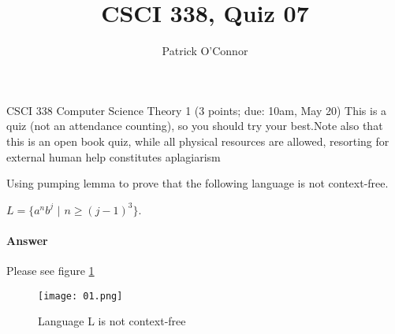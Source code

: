 \documentclass{article}
\title{CSCI 338, Quiz 07}
\author{Patrick O'Connor}
\begin{document}
\maketitle

CSCI 338 Computer Science Theory
1 (3 points; due: 10am, May 20)
This is a quiz (not an attendance counting), so you should 
try your best.Note also that this is an open book quiz, 
while all physical resources are allowed, resorting for external human 
help constitutes aplagiarism


Using pumping lemma to prove that the following language is not context-free.

$L = \{a^n b^j $ $|$ $n\geq (j-1)^3\}$.

\paragraph{Answer}

Please see figure \ref{fig:num01}
\begin{figure}
    \texttt{[image: 01.png]}
    \caption{Language L is not context-free}
    \label{fig:num01}
\end{figure}
\end{document}
